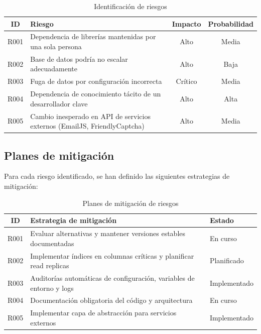 \documentclass[12pt,letterpaper]{article}
\begin{document}
\begin{table}[H]
\centering
\caption{Identificación de riesgos}
\label{tab:riesgos}
\begin{tabular}{|c|p{6cm}|c|c|}
\hline
\textbf{ID} & \textbf{Riesgo} & \textbf{Impacto} & \textbf{Probabilidad} \\ \hline
R001 & Dependencia de librerías mantenidas por una sola persona & Alto & Media \\ \hline
R002 & Base de datos podría no escalar adecuadamente & Alto & Baja \\ \hline
R003 & Fuga de datos por configuración incorrecta & Crítico & Media \\ \hline
R004 & Dependencia de conocimiento tácito de un desarrollador clave & Alto & Alta \\ \hline
R005 & Cambio inesperado en API de servicios externos (EmailJS, FriendlyCaptcha) & Alto & Media \\ \hline
\end{tabular}
\end{table}

\subsection{Planes de mitigación}

Para cada riesgo identificado, se han definido las siguientes estrategias de mitigación:

\begin{table}[H]
\centering
\caption{Planes de mitigación de riesgos}
\label{tab:mitigacion}
\begin{tabular}{|c|p{7cm}|p{5cm}|}
\hline
\textbf{ID} & \textbf{Estrategia de mitigación} & \textbf{Estado} \\ \hline
R001 & Evaluar alternativas y mantener versiones estables documentadas & En curso \\ \hline
R002 & Implementar índices en columnas críticas y planificar read replicas & Planificado \\ \hline
R003 & Auditorías automáticas de configuración, variables de entorno y logs & Implementado \\ \hline
R004 & Documentación obligatoria del código y arquitectura & En curso \\ \hline
R005 & Implementar capa de abstracción para servicios externos & Implementado \\ \hline
\end{tabular}
\end{table}
\end{document}
